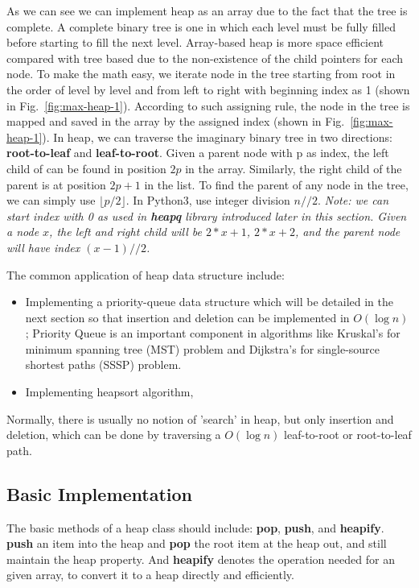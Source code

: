 \documentclass[main.tex]{subfiles}
\begin{document}
As we can see we can implement heap as an array due to the fact that the tree is complete. A complete binary tree is one in which each level must be fully filled before starting to fill the next level. Array-based heap is more space efficient compared with tree based due to the non-existence of the child pointers for each node. To make the math easy, we iterate node in the tree starting from root in the order of level by level and from left to right with beginning index as 1 (shown in Fig.~\ref{fig:max-heap-1}).  According to such assigning rule, the node in the tree is mapped and saved in the array by the assigned index (shown in Fig.~\ref{fig:max-heap-1}). In heap, we can traverse the imaginary binary tree in two directions:  \textbf{root-to-leaf} and  \textbf{leaf-to-root}. Given a parent node with p as index, the left child of can be found in position $2p$ in the array. Similarly, the right child of the parent is at position $2p + 1$ in the list. To find the parent of any node in the tree,  we can simply use $\lfloor p/2\rfloor$.  In Python3, use integer division $n//2$. \textit{Note: we can start index with 0 as used in \textbf{heapq} library introduced later in this section. Given a node $x$, the left and right child will be $2*x+1$, $2*x+2$, and the parent node will have index $(x-1)//2$.}

The common application of heap data structure include:
\begin{itemize}
    \item Implementing a priority-queue data structure which will be detailed in the next section so that insertion and deletion can be implemented in $O(\log n)$; Priority Queue is an important component in algorithms like Kruskal's for minimum spanning tree (MST) problem and Dijkstra's for single-source shortest paths (SSSP) problem. 
    \item Implementing heapsort algorithm,
\end{itemize}

Normally, there is usually no notion of 'search' in heap, but only insertion and deletion, which can be done by traversing a $O(\log n)$ leaf-to-root or root-to-leaf path. 
\subsection{Basic Implementation}
The basic methods of a heap class should include: \textbf{pop}, \textbf{push}, and \textbf{heapify}. \textbf{push} an item into the heap and \textbf{pop} the root item at the heap out, and still maintain the heap property.  And \textbf{heapify} denotes the operation needed for an given array, to convert it to a heap directly and efficiently. 
\end{document}
